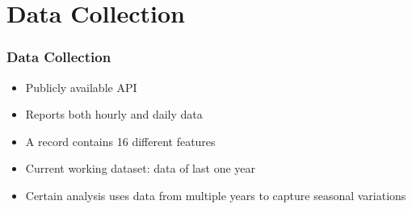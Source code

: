 \section{Data Collection}
\begin{frame}
\frametitle{Data Collection}
\begin{itemize}
\setlength\itemsep{1em}
\item Publicly available API
\item Reports both hourly and daily data
\item A record contains 16 different features
\item Current working dataset: data of last one year
\item Certain analysis uses data from multiple years to capture seasonal variations
\end{itemize}
\end{frame}
